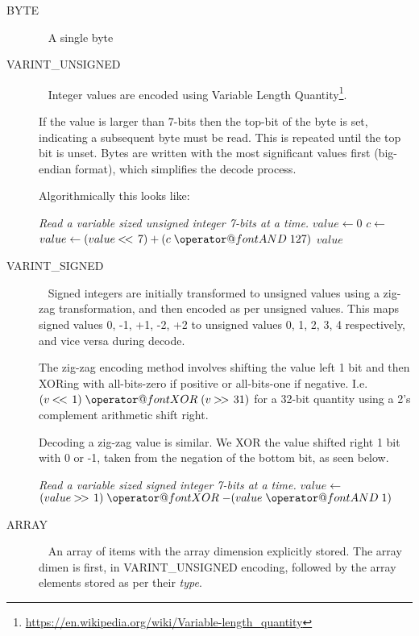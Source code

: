 \documentclass[a4paper]{article}
\makeatletter
\newcommand*{\bitand}{%
  \nonscript\mskip-\medmuskip\mkern5mu%
  \mathbin{\operator@font AND}\penalty900\mkern5mu%
  \nonscript\mskip-\medmuskip
}
\newcommand*{\bitxor}{%
  \nonscript\mskip-\medmuskip\mkern5mu%
  \mathbin{\operator@font XOR}\penalty900\mkern5mu%
  \nonscript\mskip-\medmuskip
}
\newcommand\shiftl{\mathbin{<\mkern-3mu<\,}}
\newcommand\shiftr{\mathbin{>\mkern-3mu>\,}}
\makeatother
\begin{document}
\begin{description}
\item[BYTE]\ \newline
A single byte

\item[VARINT\_UNSIGNED]\ \newline
Integer values are encoded using Variable Length
Quantity\footnote{\url{https://en.wikipedia.org/wiki/Variable-length_quantity}}.

If the value is larger than 7-bits then the top-bit of the byte is
set, indicating a subsequent byte must be read.  This is repeated
until the top bit is unset. Bytes are written with the most
significant values first (big-endian format), which simplifies the
decode process.

Algorithmically this looks like:

\begin{algorithmic}[1]
\Statex
\Statex \textit{Read a variable sized unsigned integer 7-bits at a time.}
  \State $value \gets 0$
  \Repeat
    \State $c \gets$ 
    \State $value \gets (value \shiftl 7) + (c \bitand 127)$
  \State \Return $value$
  \EndFunction
\end{algorithmic}

\item[VARINT\_SIGNED]\ \newline
Signed integers are initially transformed to unsigned values using a zig-zag transformation, and then encoded as per unsigned values.
This maps signed values 0, -1, +1, -2, +2 to unsigned values 0, 1, 2, 3, 4 respectively, and vice versa during decode.

The zig-zag encoding method involves shifting the value left 1
bit and then XORing with all-bits-zero if positive or all-bits-one if
negative. I.e. $(v \shiftl 1) \bitxor (v \shiftr 31)$ for a
32-bit quantity using a 2's complement arithmetic shift right.

Decoding a zig-zag value is similar.  We XOR the value shifted right 1
bit with 0 or -1, taken from the negation of the bottom bit, as seen
below.

\begin{algorithmic}[1]
\Statex
\Statex \textit{Read a variable sized signed integer 7-bits at a time.}
  \State $value \gets $ 
  \State \Return $(value \shiftr 1) \bitxor -(value \bitand 1)$
  \EndFunction
\end{algorithmic}

\item[ARRAY]\ \newline
An array of items with the array dimension explicitly stored.
The array dimen is first, in VARINT\_UNSIGNED encoding, followed by the array elements stored as per their \textit{type}.

\end{description}
\end{document}
